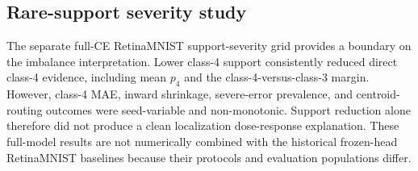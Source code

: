 \subsection{Rare-support severity study}
\label{sec:results-severity}

The separate full-CE RetinaMNIST support-severity grid provides a boundary on
the imbalance interpretation. Lower class-4 support consistently reduced direct
class-4 evidence, including mean $p_4$ and the class-4-versus-class-3 margin.
However, class-4 MAE, inward shrinkage, severe-error prevalence, and
centroid-routing outcomes were seed-variable and non-monotonic. Support
reduction alone therefore did not produce a clean localization dose-response
explanation. These full-model results are not numerically combined with the
historical frozen-head RetinaMNIST baselines because their protocols and
evaluation populations differ.
